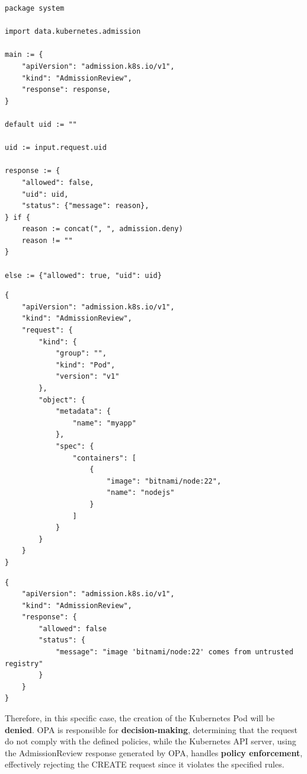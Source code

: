 \begin{lstlisting}[language=Rego, caption={Rego ``root" policy (system.main)}, label=lst:rego_root_policy]
package system

import data.kubernetes.admission

main := {
	"apiVersion": "admission.k8s.io/v1",
	"kind": "AdmissionReview",
	"response": response,
}

default uid := ""

uid := input.request.uid

response := {
	"allowed": false,
	"uid": uid,
	"status": {"message": reason},
} if {
	reason := concat(", ", admission.deny)
	reason != ""
}

else := {"allowed": true, "uid": uid}
\end{lstlisting}

\lstset{style=jsonstyle}
\begin{lstlisting}[caption={AdmissionReview request}, label={lst:admission_review_request}]
{
    "apiVersion": "admission.k8s.io/v1",
    "kind": "AdmissionReview",
    "request": {
        "kind": {
            "group": "",
            "kind": "Pod",
            "version": "v1"
        },
        "object": {
            "metadata": {
                "name": "myapp"
            },
            "spec": {
                "containers": [
                    {
                        "image": "bitnami/node:22",
                        "name": "nodejs"
                    }
                ]
            }
        }
    }
}
\end{lstlisting}

\lstset{style=jsonstyle}
\begin{lstlisting}[caption={AdmissionReview response}, label={lst:admission_review_response}]
{
    "apiVersion": "admission.k8s.io/v1",
    "kind": "AdmissionReview",
    "response": {
        "allowed": false
        "status": {
            "message": "image 'bitnami/node:22' comes from untrusted registry"
        }
    }
}
\end{lstlisting}

Therefore, in this specific case, the creation of the Kubernetes Pod will be \textbf{denied}. 
OPA is responsible for \textbf{decision-making}, determining that the request do not comply with the defined policies, while the Kubernetes API server, using the AdmissionReview response generated by OPA, handles \textbf{policy enforcement}, effectively rejecting the CREATE request since it violates the specified rules.

